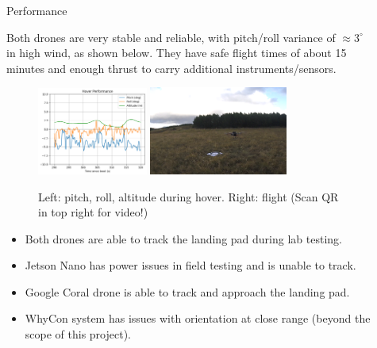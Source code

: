 \documentclass[final, 20pt]{beamer}
\newlength{\sepwidth}
\newlength{\colwidth}
\newcommand{\separatorcolumn}{\begin{column}{\sepwidth}\end{column}}
\begin{document}
\begin{frame}[t]
\begin{columns}[t]
\begin{column}{\colwidth}
\end{column}

\separatorcolumn

\begin{column}{\colwidth}

  \begin{alertblock}{Performance}

      Both drones are very stable and reliable, with pitch/roll variance of $\approx 3^{\circ}$ in high wind, as shown below.
      They have safe flight times of about 15 minutes and enough thrust to carry additional instruments/sensors.
      \begin{figure}
        \includegraphics[width=0.3575\textwidth]{stability.png}
        \hspace{1cm}
        \includegraphics[width=0.45\textwidth]{drone_in_flight.png}
        \caption*{Left: pitch, roll, altitude during hover. Right: flight (Scan QR in top right for video!)}
      \end{figure}

    \vspace{-0.5cm}

      \begin{itemize}
        \item Both drones are able to track the landing pad during lab testing.
        \item Jetson Nano has power issues in field testing and is unable to track.
        \item Google Coral drone is able to track and approach the landing pad.
        \item WhyCon system has issues with orientation at close range (beyond the scope of this project).
      \end{itemize}


\end{alertblock}
\end{column}
\end{columns}
\end{frame}
\end{document}

